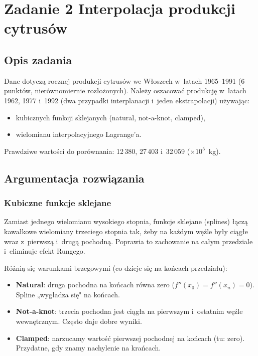 \documentclass[12pt, a4paper]{article}
\begin{document}
\section{Zadanie 2 \textemdash{} Interpolacja produkcji cytrusów}

\subsection{Opis zadania}

Dane dotyczą rocznej produkcji cytrusów we Włoszech w~latach 1965--1991
(6 punktów, nierównomiernie rozłożonych). Należy oszacować produkcję
w~latach 1962, 1977 i~1992 (dwa przypadki interplanacji i~jeden ekstrapolacji)
używając:
\begin{itemize}
  \item kubicznych funkcji sklejanych (natural, not-a-knot, clamped),
  \item wielomianu interpolacyjnego Lagrange'a.
\end{itemize}
Prawdziwe wartości do porównania: 12\,380, 27\,403 i~32\,059
($\times 10^5$~kg).

\subsection{Argumentacja rozwiązania}

\subsubsection{Kubiczne funkcje sklejane}

Zamiast jednego wielomianu wysokiego stopnia, funkcje sklejane (splines)
łączą kawałkowe wielomiany trzeciego stopnia tak, żeby na każdym węźle
były ciągłe wraz z~pierwszą i~drugą pochodną. Poprawia to zachowanie
na całym przedziale i~eliminuje efekt Rungego.

Różnią się warunkami brzegowymi (co dzieje się na końcach przedziału):
\begin{itemize}
  \item \textbf{Natural}: druga pochodna na końcach równa zero
        ($f''(x_0) = f''(x_n) = 0$). Spline „wygładza się" na końcach.
  \item \textbf{Not-a-knot}: trzecia pochodna jest ciągła na pierwszym
        i~ostatnim węźle wewnętrznym. Często daje dobre wyniki.
  \item \textbf{Clamped}: narzucamy wartość pierwszej pochodnej na końcach
        (tu: zero). Przydatne, gdy znamy nachylenie na krańcach.
\end{itemize}
\end{document}
